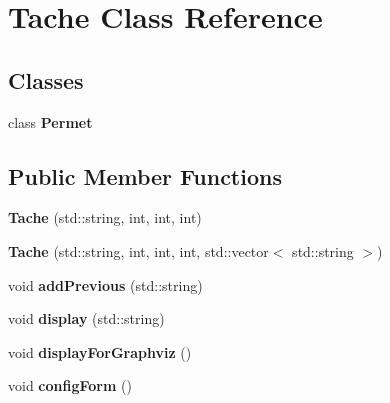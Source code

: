 \section{Tache Class Reference}
\label{class_tache}
\subsection*{Classes}
\begin{DoxyCompactItemize}
\item 
class {\bf Permet}
\end{DoxyCompactItemize}
\subsection*{Public Member Functions}
\begin{DoxyCompactItemize}
\item 
{\bfseries Tache} (std\-::string, int, int, int)\label{class_tache_a6170b813e1a27599ad8537210d4c6a73}

\item 
{\bfseries Tache} (std\-::string, int, int, int, std\-::vector$<$ std\-::string $>$)\label{class_tache_a9241ace26154b8843d1479d3ce009ecb}

\item 
void {\bfseries add\-Previous} (std\-::string)\label{class_tache_a7ec08d5bd9391c93ce800a7e5e23aab7}

\item 
void {\bfseries display} (std\-::string)\label{class_tache_aaac93ad74254a4e995ecc9843bef0708}

\item 
void {\bfseries display\-For\-Graphviz} ()\label{class_tache_a7d4f76406c56af8fb040b5656db29efa}

\item 
void {\bfseries config\-Form} ()\label{class_tache_a2f22533ac40c5b2164ce07c41ad342e0}

\end{DoxyCompactItemize}
